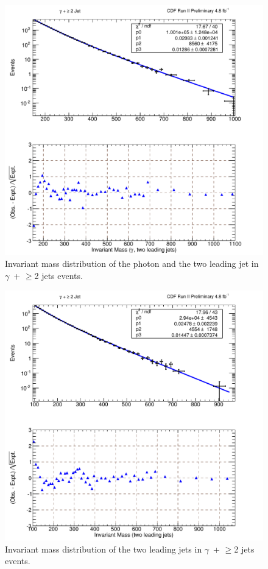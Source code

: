 \begin{figure}[htb!]
\centering
\includegraphics[scale=\resultsMassFitScale,keepaspectratio=true]{gjets_pj2_pj1j2MassFit.pdf}
\caption{Invariant mass distribution of the photon and the two leading jet in $\gamma$~+ $\geq$2 jets events.}
\label{fig:MassFit_pj2_pj1j2}
\end{figure}

\begin{figure}[htb!]
\centering
\includegraphics[scale=\resultsMassFitScale,keepaspectratio=true]{gjets_pj2_j1j2MassFit.pdf}
\caption[Invariant mass distribution of the two leading jets in $\gamma$~+ $\geq$2 \mbox{jets } events.]{Invariant mass distribution of the two leading jets in $\gamma$~+ $\geq$2 jets events.}
\label{fig:MassFit_pj2_j1j2}
\end{figure}


